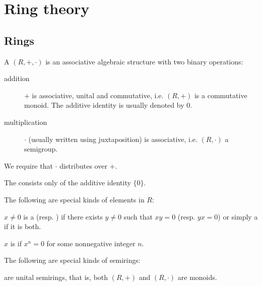 \section{Ring theory}\label{sec:ring_theory}
\subsection{Rings}\label{subsec:rings}

\begin{definition}\label{def:semiring}
  A  \( (R, +, \cdot) \) is an associative algebraic structure with two binary operations:
  \begin{description}
    \item[addition] \( + \) is associative, unital and commutative, i.e. \( (R, +) \) is a commutative monoid. The additive identity is usually denoted by \( 0 \).

    \item[multiplication] \( \cdot \) (usually written using juxtaposition) is associative, i.e. \( (R, \cdot) \) a semigroup.
  \end{description}

  We require that \( \cdot \) distributes over \( + \).

  The  consists only of the additive identity \( \{ 0 \} \).

  The following are special kinds of elements in \( R \):
  \begin{defenum}
     \( x \neq 0 \) is a  (resp. ) if there exists \( y \neq 0 \) such that \( xy = 0 \) (resp. \( yx = 0 \)) or simply a  if it is both.

     \( x \) is  if \( x^n = 0 \) for some nonnegative integer \( n \).
  \end{defenum}

  The following are special kinds of semirings:
  \begin{defenum}
      are unital semirings, that is, both \( (R, +) \) and \( (R, \cdot) \) are monoids.


\end{defenum}
\end{definition}
